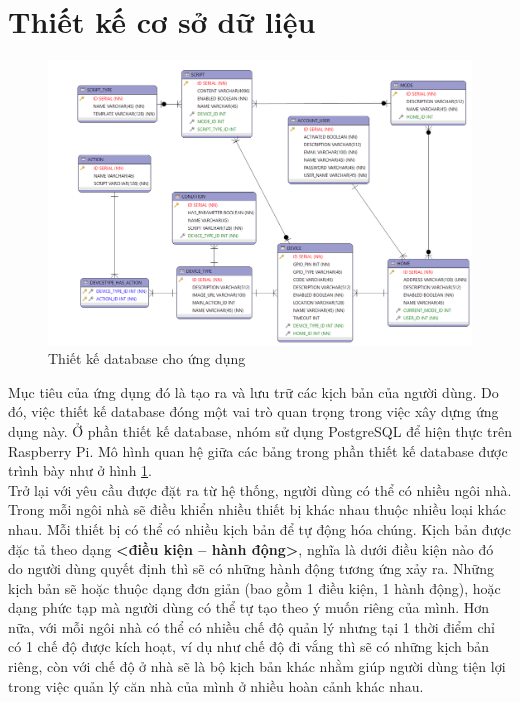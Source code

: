 \documentclass[12pt,a4paper,oneside]{extbook}
\begin{document}
\section{Thiết kế cơ sở dữ liệu}

\begin{figure}[h]
  \centering
     \includegraphics[width=15.5cm]{3-smart-home-db}
  \caption{Thiết kế database cho ứng dụng}\label{fig:3-smart-home-db}
\end{figure}

Mục tiêu của ứng dụng đó là tạo ra và lưu trữ các kịch bản của người dùng. Do đó, việc thiết kế database đóng một vai trò quan trọng trong việc xây dựng ứng dụng này. Ở phần thiết kế database, nhóm sử dụng PostgreSQL để hiện thực trên Raspberry Pi. Mô hình quan hệ giữa các bảng trong phần thiết kế database được trình bày như ở hình \ref{fig:3-smart-home-db}.\\

\noindent
Trở lại với yêu cầu được đặt ra từ hệ thống, người dùng có thể có nhiều ngôi nhà. Trong mỗi ngôi nhà sẽ điều khiển nhiều thiết bị khác nhau thuộc nhiều loại khác nhau. Mỗi thiết bị có thể có nhiều kịch bản để tự động hóa chúng. Kịch bản được đặc tả theo dạng \textbf{<điều kiện – hành động>}, nghĩa là dưới điều kiện nào đó do người dùng quyết định thì sẽ có những hành động tương ứng xảy ra. Những kịch bản sẽ hoặc thuộc dạng đơn giản (bao gồm 1 điều kiện, 1 hành động), hoặc dạng phức tạp mà người dùng có thể tự tạo theo ý muốn riêng của mình. Hơn nữa, với mỗi ngôi nhà có thể có nhiều chế độ quản lý nhưng tại 1 thời điểm chỉ có 1 chế độ được kích hoạt, ví dụ như chế độ đi vắng thì sẽ có những kịch bản riêng, còn với chế độ ở nhà sẽ là bộ kịch bản khác nhằm giúp người dùng tiện lợi trong việc quản lý căn nhà của mình ở nhiều hoàn cảnh khác nhau.\\
\end{document}
